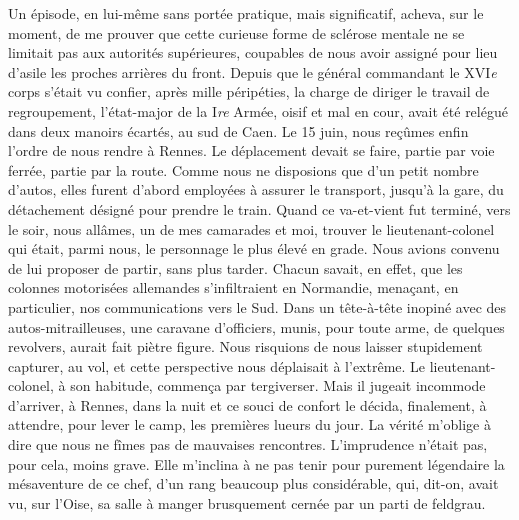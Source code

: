 \documentclass[french,twoside]{book} %
\begin{document}
Un épisode, en lui-même sans portée pratique, mais significatif, acheva, sur le moment, de me prouver que cette curieuse forme de sclérose mentale ne se limitait pas aux autorités supérieures,   coupables de nous avoir assigné pour lieu d’asile les proches arrières du front. Depuis que le général commandant le XVI\emph{e} corps s’était vu confier, après mille péripéties, la charge de diriger le travail de regroupement, l’état-major de la I\emph{re} Armée, oisif et mal en cour, avait été relégué dans deux manoirs écartés, au sud de Caen. Le 15 juin, nous reçûmes enfin l’ordre de nous rendre à Rennes. Le déplacement devait se faire, partie par voie ferrée, partie par la route. Comme nous ne disposions que d’un petit nombre d’autos, elles furent d’abord employées à assurer le transport, jusqu’à la gare, du détachement désigné pour prendre le train. Quand ce va-et-vient fut terminé, vers le soir, nous allâmes, un de mes camarades et moi, trouver le lieutenant-colonel qui était, parmi nous, le personnage le plus élevé en grade. Nous avions convenu de lui proposer de partir, sans plus tarder. Chacun savait, en effet, que les colonnes motorisées allemandes s’infiltraient en Normandie, menaçant, en particulier, nos communications vers le Sud. Dans un tête-à-tête inopiné avec des autos-mitrailleuses, une caravane d’officiers, munis, pour toute arme, de quelques revolvers, aurait fait piètre figure. Nous risquions de nous laisser stupidement capturer, au vol, et cette perspective nous déplaisait à l’extrême. Le lieutenant-colonel, à son habitude, commença par tergiverser. Mais il jugeait incommode d’arriver, à Rennes, dans la nuit et ce souci de confort le décida, finalement, à attendre, pour lever le camp, les premières lueurs du jour. La vérité m’oblige à dire que nous ne fîmes pas de mauvaises rencontres. L’imprudence n’était pas, pour cela, moins grave. Elle m’inclina à ne pas tenir pour purement légendaire la mésaventure de ce chef, d’un rang beaucoup plus considérable, qui, dit-on, avait vu, sur l’Oise, sa salle à manger brusquement cernée par un parti de feldgrau.\par
\end{document}
